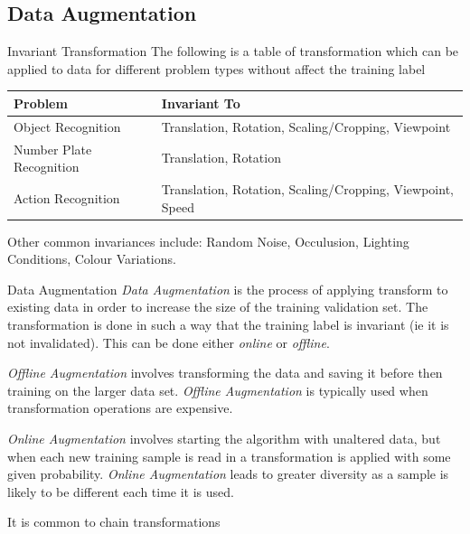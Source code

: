 \documentclass[11pt,a4paper]{article}
\begin{document}
\subsection{Data Augmentation}

  \begin{proposition}{Invariant Transformation}
    The following is a table of transformation which can be applied to data for different problem types without affect the training label
    \begin{center}
      \begin{tabular}{|l|l|}
        \hline
        \textbf{Problem}&\textbf{Invariant To}\\
        \hline
        Object Recognition& Translation, Rotation, Scaling/Cropping, Viewpoint\\
        Number Plate Recognition & Translation, Rotation\\
        Action Recognition & Translation, Rotation, Scaling/Cropping, Viewpoint, Speed\\
        \hline
      \end{tabular}
    \end{center}
    Other common invariances include: Random Noise, Occulusion, Lighting Conditions, Colour Variations.
  \end{proposition}

  \begin{definition}{Data Augmentation}
    \textit{Data Augmentation} is the process of applying transform to existing data in order to increase the size of the training validation set. The transformation is done in such a way that the training label is invariant (ie it is not invalidated). This can be done either \textit{online} or \textit{offline}.
    \par \textit{Offline Augmentation} involves transforming the data and saving it before then training on the larger data set. \textit{Offline Augmentation} is typically used when transformation operations are expensive.
    \par \textit{Online Augmentation} involves starting the algorithm with unaltered data, but when each new training sample is read in a transformation is applied with some given probability. \textit{Online Augmentation} leads to greater diversity as a sample is likely to be different each time it is used.
    \par It is common to chain transformations
  \end{definition}
\end{document}
